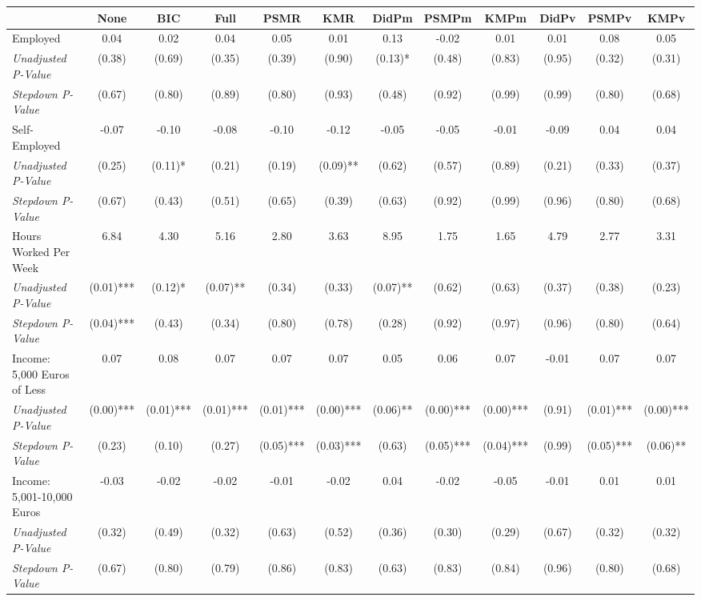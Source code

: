 \begin{tabular}{l c c c c c c c c c c c}
\toprule
 & None & BIC & Full & PSMR & KMR & DidPm & PSMPm & KMPm & DidPv & PSMPv & KMPv \\
\midrule
Employed & 0.04 & 0.02 & 0.04 & 0.05 & 0.01 & 0.13 & -0.02 & 0.01 & 0.01 & 0.08 & 0.05 \\
\quad \textit{Unadjusted P-Value} & (0.38) & (0.69) & (0.35) & (0.39) & (0.90) & (0.13)* & (0.48) & (0.83) & (0.95) & (0.32) & (0.31) \\
\quad \textit{Stepdown P-Value} & (0.67) & (0.80) & (0.89) & (0.80) & (0.93) & (0.48) & (0.92) & (0.99) & (0.99) & (0.80) & (0.68) \\
Self-Employed & -0.07 & -0.10 & -0.08 & -0.10 & -0.12 & -0.05 & -0.05 & -0.01 & -0.09 & 0.04 & 0.04 \\
\quad \textit{Unadjusted P-Value} & (0.25) & (0.11)* & (0.21) & (0.19) & (0.09)** & (0.62) & (0.57) & (0.89) & (0.21) & (0.33) & (0.37) \\
\quad \textit{Stepdown P-Value} & (0.67) & (0.43) & (0.51) & (0.65) & (0.39) & (0.63) & (0.92) & (0.99) & (0.96) & (0.80) & (0.68) \\
Hours Worked Per Week & 6.84 & 4.30 & 5.16 & 2.80 & 3.63 & 8.95 & 1.75 & 1.65 & 4.79 & 2.77 & 3.31 \\
\quad \textit{Unadjusted P-Value} & (0.01)*** & (0.12)* & (0.07)** & (0.34) & (0.33) & (0.07)** & (0.62) & (0.63) & (0.37) & (0.38) & (0.23) \\
\quad \textit{Stepdown P-Value} & (0.04)*** & (0.43) & (0.34) & (0.80) & (0.78) & (0.28) & (0.92) & (0.97) & (0.96) & (0.80) & (0.64) \\
Income: 5,000 Euros of Less & 0.07 & 0.08 & 0.07 & 0.07 & 0.07 & 0.05 & 0.06 & 0.07 & -0.01 & 0.07 & 0.07 \\
\quad \textit{Unadjusted P-Value} & (0.00)*** & (0.01)*** & (0.01)*** & (0.01)*** & (0.00)*** & (0.06)** & (0.00)*** & (0.00)*** & (0.91) & (0.01)*** & (0.00)*** \\
\quad \textit{Stepdown P-Value} & (0.23) & (0.10) & (0.27) & (0.05)*** & (0.03)*** & (0.63) & (0.05)*** & (0.04)*** & (0.99) & (0.05)*** & (0.06)** \\
Income: 5,001-10,000 Euros & -0.03 & -0.02 & -0.02 & -0.01 & -0.02 & 0.04 & -0.02 & -0.05 & -0.01 & 0.01 & 0.01 \\
\quad \textit{Unadjusted P-Value} & (0.32) & (0.49) & (0.32) & (0.63) & (0.52) & (0.36) & (0.30) & (0.29) & (0.67) & (0.32) & (0.32) \\
\quad \textit{Stepdown P-Value} & (0.67) & (0.80) & (0.79) & (0.86) & (0.83) & (0.63) & (0.83) & (0.84) & (0.96) & (0.80) & (0.68) \\

\end{tabular}
